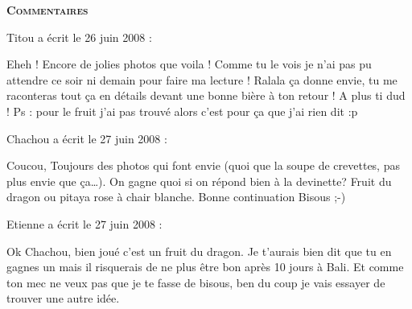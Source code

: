 \bigskip
\textbf{\textsc{Commentaires}}

\medskip
Titou a écrit le 26 juin 2008 :
\begin{displayquote}
Eheh ! Encore de jolies photos que voila ! Comme tu le vois je n'ai pas pu attendre ce soir ni demain pour faire ma lecture !
Ralala ça donne envie, tu me raconteras tout ça en détails devant une bonne bière à ton retour !
A plus ti dud !
Ps : pour le fruit j'ai pas trouvé alors c'est pour ça que j'ai rien dit :p
\end{displayquote}

\medskip
Chachou a écrit le 27 juin 2008 :
\begin{displayquote}
Coucou,
Toujours des photos qui font envie (quoi que la soupe de crevettes, pas plus envie que ça\dots).
On gagne quoi si on répond bien à la devinette?
Fruit du dragon ou pitaya rose à chair blanche.
Bonne continuation
Bisous ;-)
\end{displayquote}

\medskip
Etienne a écrit le 27 juin 2008 :
\begin{displayquote}
Ok Chachou, bien joué c'est un fruit du dragon. Je t'aurais bien dit que tu en gagnes un mais il risquerais de ne plus être bon après 10 jours à Bali. Et comme ton mec ne veux pas que je te fasse de bisous, ben du coup je vais essayer de trouver une autre idée.
\end{displayquote}

\vfill
